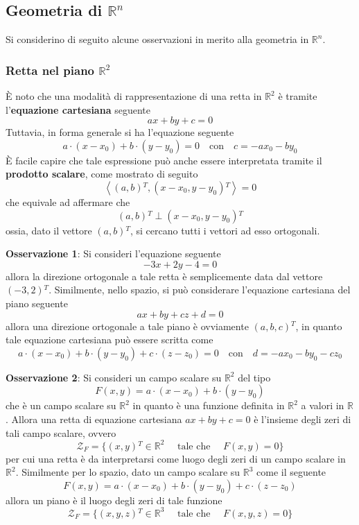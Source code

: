 \documentclass[a4paper]{extarticle}
\begin{document}
\newpage
\subsection{Geometria di $\mathbb{R}^n$}
Si considerino di seguito alcune osservazioni in merito alla geometria in $\mathbb{R}^n$.

\vspace{1em}
\subsubsection{Retta nel piano $\mathbb{R}^2$}
È noto che una modalità di rappresentazione di una retta in $\mathbb{R}^2$ è tramite l'\textbf{equazione cartesiana} seguente
\[ax+by+c=0\]
Tuttavia, in forma generale si ha l'equazione seguente
\[a \cdot (x-x_0) + b \cdot (y-y_0) = 0 \hspace{1em} \text{con} \hspace{1em} c=-ax_0-by_0\]
È facile capire che tale espressione può anche essere interpretata tramite il \textbf{prodotto scalare}, come mostrato di seguito
\[\left<\left(a,b\right){^T},\left(x-x_0,y-y_0\right){^T}\right> = 0\]
che equivale ad affermare che
\[\left(a,b\right){^T} \perp \left(x-x_0,y-y_0\right){^T}\]
ossia, dato il vettore $\left(a,b\right){^T}$, si cercano tutti i vettori ad esso ortogonali.

\vspace{2em}
\noindent
\textbf{Osservazione 1}: Si consideri l'equazione seguente
\[-3x+2y-4=0\]
allora la direzione ortogonale a tale retta è semplicemente data dal vettore $(-3,2){^T}$. Similmente, nello spazio, si può considerare l'equazione cartesiana del piano seguente
\[ax+by+cz+d=0\]
allora una direzione ortogonale a tale piano è ovviamente $(a,b,c){^T}$, in quanto tale equazione cartesiana può essere scritta come
\[a \cdot (x-x_0) + b \cdot (y-y_0) + c \cdot (z-z_0) = 0 \hspace{1em} \text{con} \hspace{1em} d=-ax_0-by_0-cz_0\]

\vspace{2em}
\noindent
\textbf{Osservazione 2}: Si consideri un campo scalare su $\mathbb{R}^2$ del tipo
\[F(x,y) = a \cdot (x-x_0) + b \cdot (y-y_0)\]
che è un campo scalare su $\mathbb{R}^2$ in quanto è una funzione definita in $\mathbb{R}^2$ a valori in $\mathbb{R}$. Allora una retta di equazione cartesiana $ax+by+c=0$ è l'insieme degli zeri di tali campo scalare, ovvero
\[\mathcal{Z}_F = \{(x,y){^T} \in \mathbb{R}^2 \hspace{1em} \text{ tale che } \hspace{1em} F(x,y) = 0\}\]
per cui una retta è da interpretarsi come luogo degli zeri di un campo scalare in $\mathbb{R}^2$. Similmente per lo spazio, dato un campo scalare su $\mathbb{R}^3$ come il seguente
\[F(x,y) = a \cdot (x-x_0) + b \cdot (y-y_0) + c \cdot (z-z_0)\]
allora un piano è il luogo degli zeri di tale funzione
\[\mathcal{Z}_F = \{(x,y,z){^T} \in \mathbb{R}^3 \hspace{1em} \text{ tale che } \hspace{1em} F(x,y,z) = 0\}\]
\end{document}

